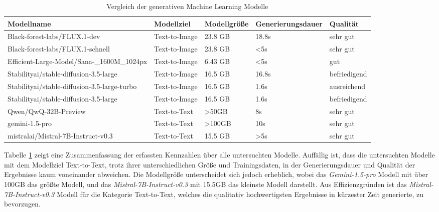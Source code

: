 \begin{table}[h]
  \begin{tabular}{|p{3cm}|p{3cm}|p{2cm}|p{2cm}|p{3cm}|}
      \hline
      \textbf{Modellname} & \textbf{Modellziel} & \textbf{Modellgröße} & \textbf{Generierungsdauer} & \textbf{Qualität}\\ \hline
      {Black-forest-labs/FLUX.1-dev} & Text-to-Image & 23.8 GB & 18.8s & sehr gut\\ \hline
      {Black-forest-labs/FLUX.1-schnell} & Text-to-Image & 23.8 GB & \textless 5s & sehr gut\\ \hline
      {Efficient-Large-Model/Sana-\_1600M\_1024px} & Text-to-Image & 6.43 GB & \textless 5s & gut\\ \hline
      {Stabilityai/stable-diffusion-3.5-large} & Text-to-Image & 16.5 GB & 16.8s & befriedigend\\ \hline
      {Stabilityai/stable-diffusion-3.5-large-turbo} & Text-to-Image & 16.5 GB & 1.6s & ausreichend\\ \hline
      {Stabilityai/stable-diffusion-3.5-large} & Text-to-Image & 16.5 GB & 1.6s& befriedigend\\ \hline
      {Qwen/QwQ-32B-Preview} & Text-to-Text & \textgreater 50GB & 8s & sehr gut\\ \hline
      {gemini-1.5-pro} & Text-to-Text & \textgreater 100GB & 10s & sehr gut\\ \hline
      {mistralai/Mistral-7B-Instruct-v0.3} & Text-to-Text & 15.5 GB & \textgreater5s & sehr gut\\ \hline
  \end{tabular}
  \caption{Vergleich der generativen Machine Learning Modelle}\label{tab:table_modellvergleich}
\end{table}

Tabelle \ref{tab:table_modellvergleich} zeigt eine Zusammenfassung der erfassten Kennzahlen über alle untersuchten Modelle.
Auffällig ist, dass die untersuchten Modelle mit dem Modellziel Text-to-Text, trotz ihrer unterschiedlichen Größe und Trainingsdaten, in der Generierungsdauer und Qualität der Ergebnisse kaum voneinander abweichen.
Die Modellgröße unterscheidet sich jedoch erheblich, wobei das \textit{Gemini-1.5-pro} Modell mit über 100GB das größte Modell, und das \textit{Mistral-7B-Instruct-v0.3} mit 15.5GB das kleinste Modell darstellt.
Aus Effizienzgründen ist das \textit{Mistral-7B-Instruct-v0.3} Modell für die Kategorie Text-to-Text, welches die qualitativ hochwertigsten Ergebnisse in kürzester Zeit generierte, zu bevorzugen.

